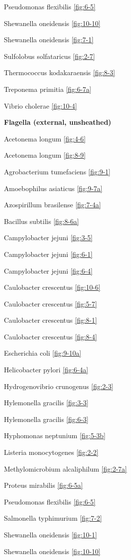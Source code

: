 \documentclass[]{tufte-book}
\begin{document}
Pseudomonas flexibilis \ref{fig:6-5}

Shewanella oneidensis \ref{fig:10-10}

Shewanella oneidensis \ref{fig:7-1}

Sulfolobus solfataricus \ref{fig:2-7}

Thermococcus kodakaraensis \ref{fig:8-3}

Treponema primitia \ref{fig:6-7a}

Vibrio cholerae \ref{fig:10-4}

\textbf{Flagella (external, unsheathed)}

Acetonema longum \ref{fig:4-6}

Acetonema longum \ref{fig:8-9}

Agrobacterium tumefaciens \ref{fig:9-1}

Amoebophilus asiaticus \ref{fig:9-7a}

Azospirillum brasilense \ref{fig:7-4a}

Bacillus subtilis \ref{fig:8-6a}

Campylobacter jejuni \ref{fig:3-5}

Campylobacter jejuni \ref{fig:6-1}

Campylobacter jejuni \ref{fig:6-4}

Caulobacter crescentus \ref{fig:10-6}

Caulobacter crescentus \ref{fig:5-7}

Caulobacter crescentus \ref{fig:8-1}

Caulobacter crescentus \ref{fig:8-4}

Escherichia coli \ref{fig:9-10a}

Helicobacter pylori \ref{fig:6-4a}

Hydrogenovibrio crunogenus \ref{fig:2-3}

Hylemonella gracilis \ref{fig:3-3}

Hylemonella gracilis \ref{fig:6-3}

Hyphomonas neptunium \ref{fig:5-3b}

Listeria monocytogenes \ref{fig:2-2}

Methylomicrobium alcaliphilum \ref{fig:2-7a}

Proteus mirabilis \ref{fig:6-5a}

Pseudomonas flexibilis \ref{fig:6-5}

Salmonella typhimurium \ref{fig:7-2}

Shewanella oneidensis \ref{fig:10-1}

Shewanella oneidensis \ref{fig:10-10}
\end{document}
